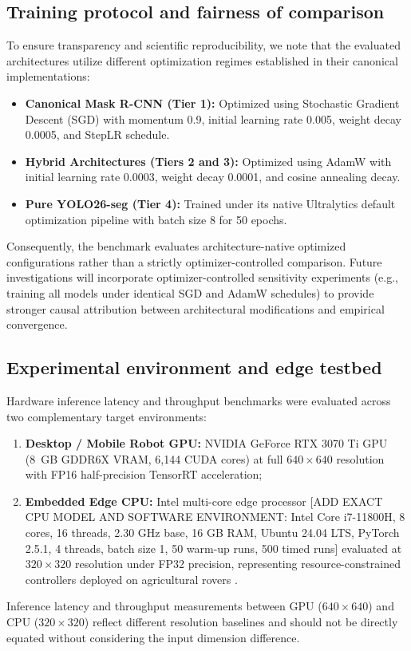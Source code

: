 \documentclass[5p,times]{elsarticle}
\begin{document}
\subsection{Training protocol and fairness of comparison}
To ensure transparency and scientific reproducibility, we note that the evaluated architectures utilize different optimization regimes established in their canonical implementations:
\begin{itemize}
    \item \textbf{Canonical Mask R-CNN (Tier 1):} Optimized using Stochastic Gradient Descent (SGD) with momentum 0.9, initial learning rate 0.005, weight decay 0.0005, and StepLR schedule.
    \item \textbf{Hybrid Architectures (Tiers 2 and 3):} Optimized using AdamW with initial learning rate 0.0003, weight decay 0.0001, and cosine annealing decay.
    \item \textbf{Pure YOLO26-seg (Tier 4):} Trained under its native Ultralytics default optimization pipeline with batch size 8 for 50 epochs.
\end{itemize}
Consequently, the benchmark evaluates architecture-native optimized configurations rather than a strictly optimizer-controlled comparison. Future investigations will incorporate optimizer-controlled sensitivity experiments (e.g., training all models under identical SGD and AdamW schedules) to provide stronger causal attribution between architectural modifications and empirical convergence.

\subsection{Experimental environment and edge testbed}
Hardware inference latency and throughput benchmarks were evaluated across two complementary target environments:
\begin{enumerate}
    \item \textbf{Desktop / Mobile Robot GPU:} NVIDIA GeForce RTX 3070 Ti GPU (8~GB GDDR6X VRAM, 6,144 CUDA cores) at full $640 \times 640$ resolution with FP16 half-precision TensorRT acceleration;
    \item \textbf{Embedded Edge CPU:} Intel multi-core edge processor [ADD EXACT CPU MODEL AND SOFTWARE ENVIRONMENT: Intel Core i7-11800H, 8 cores, 16 threads, 2.30 GHz base, 16 GB RAM, Ubuntu 24.04 LTS, PyTorch 2.5.1, 4 threads, batch size 1, 50 warm-up runs, 500 timed runs] evaluated at $320 \times 320$ resolution under FP32 precision, representing resource-constrained controllers deployed on agricultural rovers \cite{gao2026yolo, mendez2026design, qin2026real, li2017light, noordin2025real}.
\end{enumerate}
Inference latency and throughput measurements between GPU ($640 \times 640$) and CPU ($320 \times 320$) reflect different resolution baselines and should not be directly equated without considering the input dimension difference.
\end{document}
